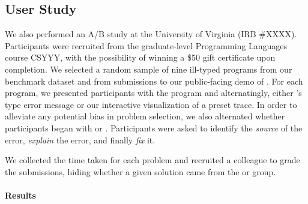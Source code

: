 \subsection{User Study}
\label{sec:user-study}
We also performed an A/B study at the University of Virginia (IRB
\#XXXX). 
%
Participants were recruited from the graduate-level Programming
Languages course CSYYY, with the possibility of winning a \$50 gift
certificate upon completion.
%
We selected a random sample of nine ill-typed programs from our
benchmark dataset and from submissions to our public-facing demo of
\nanomaly.
%
For each program, we presented participants with the program and
alternatingly, either \ocaml's type error message or our interactive
visualization of a preset trace.
%
In order to alleviate any potential bias in problem selection, we also
alternated whether participants began with \ocaml or \nanomaly.
%
Participants were asked to identify the \emph{source} of the error,
\emph{explain} the error, and finally \emph{fix} it.

We collected the time taken for each problem and recruited a colleague
to grade the submissions, hiding whether a given solution came from the
\ocaml or \nanomaly group.

\paragraph{Results}
\label{sec:study-results}
